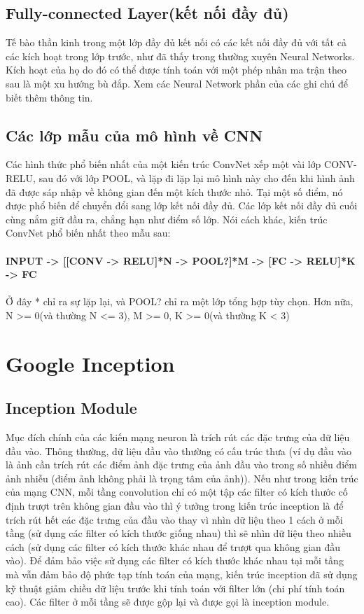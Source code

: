 \documentclass[a4paper,12pt]{report}
\begin{document}
\section{Fully-connected Layer(kết nối đầy đủ)}
Tế bào thần kinh trong một lớp đầy đủ kết nối có các kết nối đầy đủ với tất cả các kích hoạt trong lớp trước, như đã thấy trong thường xuyên Neural Networks. Kích hoạt của họ do đó có thể được tính toán với một phép nhân ma trận theo sau là một xu hướng bù đắp. Xem các Neural Network phần của các ghi chú để biết thêm thông tin.
\section{Các lớp mẫu của mô hình về CNN}
Các hình thức phổ biến nhất của một kiến trúc ConvNet xếp một vài lớp CONV-RELU, sau đó với lớp POOL, và lặp đi lặp lại mô hình này cho đến khi hình ảnh đã được sáp nhập về không gian đến một kích thước nhỏ. Tại một số điểm, nó được phổ biến để chuyển đổi sang lớp kết nối đầy đủ. Các lớp kết nối đầy đủ cuối cùng nắm giữ đầu ra, chẳng hạn như điểm số lớp. Nói cách khác, kiến trúc ConvNet phổ biến nhất theo mẫu sau: \\
\\
\small{
\textbf{INPUT -> [[CONV -> RELU]*N -> POOL?]*M -> [FC -> RELU]*K -> FC}
}
\\ \\
Ở đây * chỉ ra sự lặp lại, và POOL? chỉ ra một lớp tổng hợp tùy chọn. Hơn nữa, N >= 0(và thường N <= 3), M >= 0, K >= 0(và thường K < 3)


\chapter{Google Inception}
\section{Inception Module \cite{googlenet}}	
Mục đích chính của các kiến mạng neuron là trích rút các đặc trưng của dữ liệu đầu vào. Thông thường, dữ liệu đầu vào thường có cấu trúc thưa (ví dụ đầu vào là ảnh cần trích rút các điểm ảnh đặc trưng của ảnh đầu vào trong số nhiều điểm ảnh nhiễu (điểm ảnh không phải là trọng tâm của ảnh)). Nếu như trong kiến trúc của mạng CNN, mỗi tầng convolution chỉ có một tập các filter có kích thước cố định trượt trên không gian đầu vào thì ý tưởng trong kiến trúc inception là để trích rút hết các đặc trưng của đầu vào thay vì nhìn dữ liệu theo 1 cách ở mỗi tầng (sử dụng các filter có kích thước giống nhau) thì sẽ nhìn dữ liệu theo nhiều cách (sử dụng các filter có kích thước khác nhau để trượt qua không gian đầu vào). Để đảm bảo việc sử dụng các filter có kích thước khác nhau tại mỗi tầng mà vẫn đảm bảo độ phức tạp tính toán của mạng, kiến trúc inception đã sử dụng kỹ thuật giảm chiều dữ liệu trước khi tính toán với filter lớn (chi phí tính toán cao). Các filter ở mỗi tầng sẽ được gộp lại và được gọi là inception module.
\end{document}
